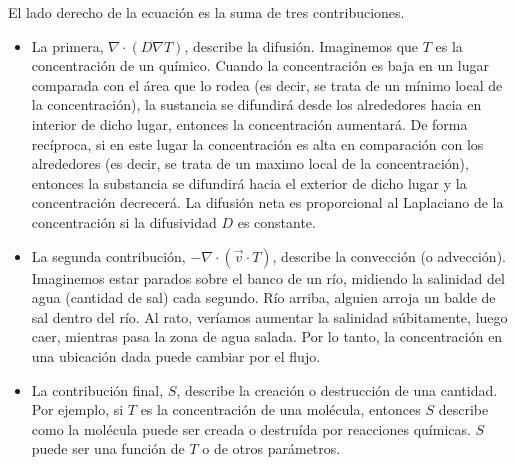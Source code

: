 \documentclass{article}
\begin{document}
  El lado derecho de la ecuación es la suma de tres contribuciones.
  \begin{itemize}
    \item La primera, \(\nabla \cdot (D \nabla T)\), describe la difusión.
    Imaginemos que \(T\) es la concentración de un químico.
    Cuando la concentración es baja en un lugar comparada con el área que lo rodea (es decir, se trata de un mínimo local de la concentración), la sustancia se difundirá desde los alrededores hacia en interior de dicho lugar, entonces la concentración aumentará.
    De forma recíproca, si en este lugar la concentración es alta en comparación con los alrededores (es decir, se trata de un maximo local de la concentración), entonces la substancia se difundirá hacia el exterior de dicho lugar y la concentración decrecerá.
    La difusión neta es proporcional al Laplaciano de la concentración si la difusividad \(D\) es constante.
    \item La segunda contribución, \(- \nabla \cdot (\vec{v} \cdot T)\), describe la convección (o advección).
    Imaginemos estar parados sobre el banco de un río, midiendo la salinidad del agua (cantidad de sal) cada segundo.
    Río arriba, alguien arroja un balde de sal dentro del río.
    Al rato, veríamos aumentar la salinidad súbitamente, luego caer, mientras pasa la zona de agua salada.
    Por lo tanto, la concentración en una ubicación dada puede cambiar por el flujo.
    \item La contribución final, \(S\), describe la creación o destrucción de una cantidad.
    Por ejemplo, si \(T\) es la concentración de una molécula, entonces \(S\) describe como la molécula puede ser creada o destruída por reacciones químicas.
    \(S\) puede ser una función de \(T\) o de otros parámetros.
  \end{itemize}
\end{document}
